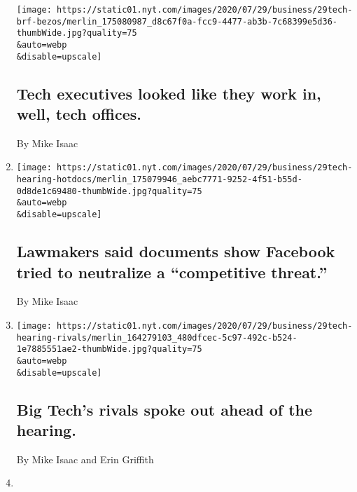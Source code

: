 \begin{enumerate}
  \texttt{[image: https://static01.nyt.com/images/2020/07/29/business/29tech-brf-bezos/merlin\_175080987\_d8c67f0a-fcc9-4477-ab3b-7c68399e5d36-thumbWide.jpg?quality=75\\\&auto=webp\\\&disable=upscale]}

  \hypertarget{tech-executives-looked-like-they-work-in-well-tech-offices}{%
  \subsection{Tech executives looked like they work in, well, tech
  offices.}\label{tech-executives-looked-like-they-work-in-well-tech-offices}}

  By Mike Isaac
\item
  \href{/live/2020/07/29/technology/tech-ceos-hearing-testimony/lawmakers-said-documents-show-facebook-tried-to-neutralize-a-competitive-threat}{}

  \texttt{[image: https://static01.nyt.com/images/2020/07/29/business/29tech-hearing-hotdocs/merlin\_175079946\_aebc7771-9252-4f51-b55d-0d8de1c69480-thumbWide.jpg?quality=75\\\&auto=webp\\\&disable=upscale]}

  \hypertarget{lawmakers-said-documents-show-facebook-tried-to-neutralize-a-competitive-threat}{%
  \subsection{Lawmakers said documents show Facebook tried to neutralize
  a ``competitive
  threat.''}\label{lawmakers-said-documents-show-facebook-tried-to-neutralize-a-competitive-threat}}

  By Mike Isaac
\item
  \href{/live/2020/07/29/technology/tech-ceos-hearing-testimony/big-techs-rivals-spoke-out-ahead-of-the-hearing}{}

  \texttt{[image: https://static01.nyt.com/images/2020/07/29/business/29tech-hearing-rivals/merlin\_164279103\_480dfcec-5c97-492c-b524-1e7885551ae2-thumbWide.jpg?quality=75\\\&auto=webp\\\&disable=upscale]}

  \hypertarget{big-techs-rivals-spoke-out-ahead-of-the-hearing}{%
  \subsection{Big Tech's rivals spoke out ahead of the
  hearing.}\label{big-techs-rivals-spoke-out-ahead-of-the-hearing}}

  By Mike Isaac and Erin Griffith
\item
  \href{/2020/07/29/technology/tech-ceos-congress-what-to-know.html}{}


\end{enumerate}

